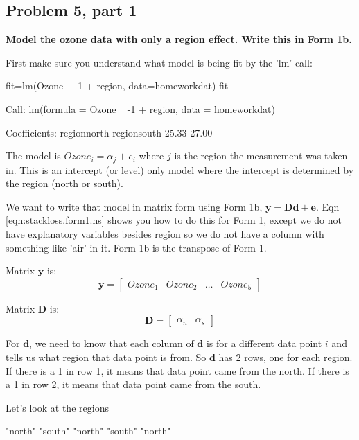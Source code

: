 \subsection*{Problem 5, part 1}
{\bf Model the ozone data with only a region effect.  Write this in Form 1b.} 
 
First make sure you understand what model is being fit by the 'lm' call:
\begin{Schunk}
\begin{Sinput}
 fit=lm(Ozone ~ -1 + region, data=homeworkdat)
 fit
\end{Sinput}
\begin{Soutput}
Call:
lm(formula = Ozone ~ -1 + region, data = homeworkdat)

Coefficients:
regionnorth  regionsouth  
      25.33        27.00  
\end{Soutput}
\end{Schunk}

The model is $Ozone_i = \alpha_j + e_i$
where $j$ is the region the measurement was taken in. This is an intercept (or level) only model where the intercept is determined by the region (north or south). 

We want to write that model in matrix form using Form 1b, $\mathbf{y}=\mathbf{D}\mathbf{d}+\mathbf{e}$.  Eqn \ref{eqn:stackloss.form1.ns} shows you how to do this for Form 1, except we do not have explanatory variables besides region so we do not have a column with something like 'air' in it.  Form 1b is the transpose of Form 1.

Matrix $\mathbf{y}$ is:
  $$\mathbf{y} = \begin{bmatrix} Ozone_1 & Ozone_2 & \dots & Ozone_5\end{bmatrix}$$

Matrix $\mathbf{D}$ is:
  $$\mathbf{D} = \begin{bmatrix} \alpha_n & \alpha_s \end{bmatrix}$$

For $\mathbf{d}$, we need to know that each column of $\mathbf{d}$ is for a different data point $i$ and tells us what region that data point is from.  So $\mathbf{d}$ has 2 rows, one for each region.  If there is a 1 in row 1, it means that data point came from the north.  If there is a 1 in row 2, it means that data point came from the south.

Let's look at the regions 
\begin{Schunk}
\begin{Soutput}
[1] "north" "south" "north" "south" "north"
\end{Soutput}
\end{Schunk}

